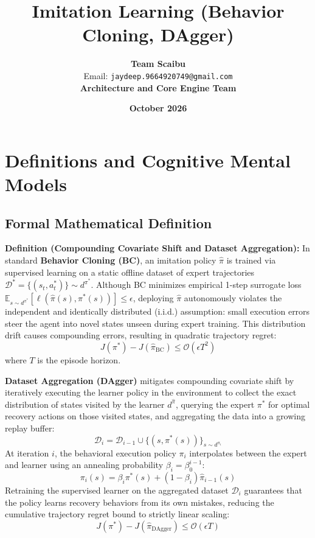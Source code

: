 \documentclass[11pt,a4paper]{article}
\title{\textbf{Imitation Learning (Behavior Cloning, DAgger)}}
\author{\textbf{Team Scaibu} \\ \small Email: \texttt{jaydeep.9664920749@gmail.com} \\ \small \textbf{Architecture and Core Engine Team}}
\date{\textbf{October 2026}}
\theoremstyle{definition}
\begin{document}
\maketitle

\section{Definitions and Cognitive Mental Models}

\subsection{Formal Mathematical Definition}
\textbf{Definition (Compounding Covariate Shift and Dataset Aggregation):}
In standard \textbf{Behavior Cloning (BC)}, an imitation policy $\hat{\pi}$ is trained via supervised learning on a static offline dataset of expert trajectories $\mathcal{D}^* = \{(s_t, a_t^*)\} \sim d^{\pi^*}$. Although BC minimizes empirical 1-step surrogate loss $\mathbb{E}_{s \sim d^{\pi^*}}[\ell(\hat{\pi}(s), \pi^*(s))] \le \epsilon$, deploying $\hat{\pi}$ autonomously violates the independent and identically distributed (i.i.d.) assumption: small execution errors steer the agent into novel states unseen during expert training. This distribution drift causes compounding errors, resulting in quadratic trajectory regret:
{\boldmath
\begin{equation}
J(\pi^*) - J(\hat{\pi}_{\text{BC}}) \le \mathcal{O}(\epsilon T^2)
\end{equation}
}
where $T$ is the episode horizon.

\textbf{Dataset Aggregation (DAgger)} mitigates compounding covariate shift by iteratively executing the learner policy in the environment to collect the exact distribution of states visited by the learner $d^{\hat{\pi}}$, querying the expert $\pi^*$ for optimal recovery actions on those visited states, and aggregating the data into a growing replay buffer:
{\boldmath
\begin{equation}
\mathcal{D}_i = \mathcal{D}_{i-1} \cup \{(s, \pi^*(s))\}_{s \sim d^{\pi_i}}
\end{equation}
}
At iteration $i$, the behavioral execution policy $\pi_i$ interpolates between the expert and learner using an annealing probability $\beta_i = \beta_0^{i-1}$:
{\boldmath
\begin{equation}
\pi_i(s) = \beta_i \pi^*(s) + (1 - \beta_i) \hat{\pi}_{i-1}(s)
\end{equation}
}
Retraining the supervised learner on the aggregated dataset $\mathcal{D}_i$ guarantees that the policy learns recovery behaviors from its own mistakes, reducing the cumulative trajectory regret bound to strictly linear scaling:
{\boldmath
\begin{equation}
J(\pi^*) - J(\hat{\pi}_{\text{DAgger}}) \le \mathcal{O}(\epsilon T)
\end{equation}
}
\end{document}
